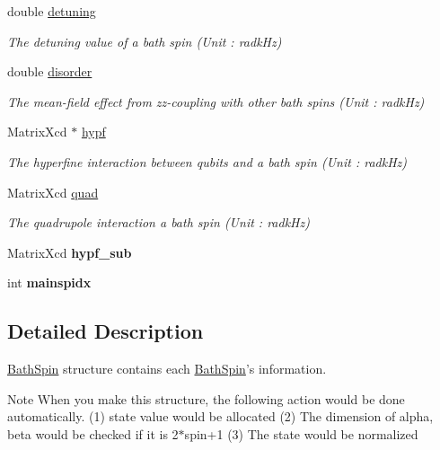 \begin{DoxyCompactItemize}
double \hyperlink{structBathSpin_a045005fcc1f5517a81e47e4a8b30e2f4}{detuning}
\begin{DoxyCompactList}\small\item\em The detuning value of a bath spin (Unit \-: radk\-Hz) \end{DoxyCompactList}\item 
double \hyperlink{structBathSpin_aad59ec954d15643047790f148dcca39b}{disorder}
\begin{DoxyCompactList}\small\item\em The mean-\/field effect from zz-\/coupling with other bath spins (Unit \-: radk\-Hz) \end{DoxyCompactList}\item 
Matrix\-Xcd $\ast$ \hyperlink{structBathSpin_aad4ead2e39f4ae27fab5701662e7ee27}{hypf}
\begin{DoxyCompactList}\small\item\em The hyperfine interaction between qubits and a bath spin (Unit \-: radk\-Hz) \end{DoxyCompactList}\item 
Matrix\-Xcd \hyperlink{structBathSpin_a304f556a5ba51a1275171e40d212d0d2}{quad}
\begin{DoxyCompactList}\small\item\em The quadrupole interaction a bath spin (Unit \-: radk\-Hz) \end{DoxyCompactList}\item 
\hypertarget{structBathSpin_afb32f13329ea501039ad7d62d0e6e2a5}{Matrix\-Xcd {\bfseries hypf\-\_\-sub}}\label{structBathSpin_afb32f13329ea501039ad7d62d0e6e2a5}

\item 
\hypertarget{structBathSpin_a26db008dfcd1cbdff57b63dfdbfbaf78}{int {\bfseries mainspidx}}\label{structBathSpin_a26db008dfcd1cbdff57b63dfdbfbaf78}

\end{DoxyCompactItemize}


\subsection{Detailed Description}
\hyperlink{structBathSpin}{Bath\-Spin} structure contains each \hyperlink{structBathSpin}{Bath\-Spin}'s information. 

\begin{DoxyNote}{Note}
When you make this structure, the following action would be done automatically. (1) state value would be allocated (2) The dimension of alpha, beta would be checked if it is 2$\ast$spin+1 (3) The state would be normalized 
\end{DoxyNote}



